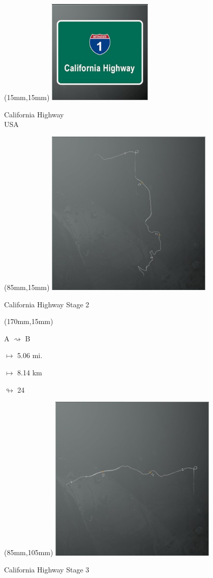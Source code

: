 \begin{textblock*}{60mm}(15mm,15mm)%
\includegraphics[width=50mm]{LG/2015-05-20_00077.png}
\par California Highway\\ USA
\end{textblock*}
\begin{textblock*}{80mm}(85mm,15mm)%
\includegraphics[width=80mm]{TR/2015-05-20_00015.png}
\centerline{California Highway Stage 2}
\end{textblock*}
\begin{textblock*}{30mm}(170mm,15mm)%
\par A $\rightsquigarrow$ B
\Large
\par$\mapsto$ 5.06 mi.
\par$\mapsto$ 8.14 km
\par$\looparrowright$ 24
\end{textblock*}
\begin{textblock*}{80mm}(85mm,105mm)%
\includegraphics[width=80mm]{TR/2015-05-20_00016.png}
\centerline{California Highway Stage 3}
\end{textblock*}
